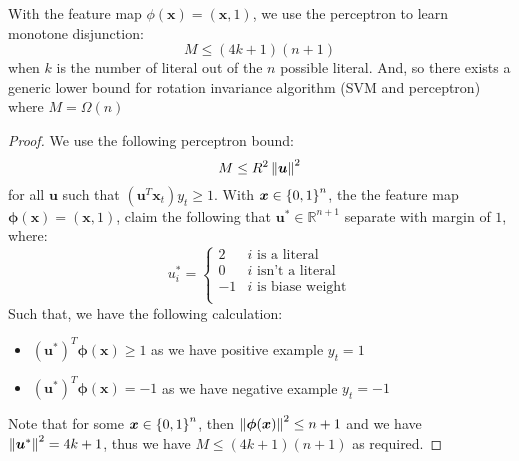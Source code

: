 \begin{corollary}
    With the feature map $\phi(\boldsymbol x) = (\boldsymbol x, 1)$, we use the perceptron to learn monotone disjunction:
    \begin{equation*}
        M \le (4k+1)(n+1)
    \end{equation*}
    when $k$ is the number of literal out of the $n$ possible literal. And, so there exists a generic lower bound for rotation invariance algorithm (SVM and perceptron) where $M = \Omega(n)$
\end{corollary}
\begin{proof}
    We use the following perceptron bound:
    \begin{equation*}
        M \le R^2\left\lVert\boldsymbol u\right\rVert^2
    \end{equation*}
    for all $\boldsymbol u$ such that $(\boldsymbol u^T\boldsymbol x_t)y_t \ge 1$. With $\boldsymbol x \in \left\{ 0, 1 \right\}^n$, the the feature map $\boldsymbol \phi(\boldsymbol x) = (\boldsymbol x, 1)$, claim the following that $\boldsymbol u^* \in \mathbb{R}^{n+1}$ separate with margin of $1$, where:
    \begin{equation*}
        u_i^* = \begin{cases}
            2 & i \text{ is a literal} \\
            0 & i \text{ isn't a literal} \\
            -1 & i \text{ is biase weight} \\
        \end{cases}
    \end{equation*}
    Such that, we have the following calculation:
    \begin{itemize}
        \item $(\boldsymbol u^*)^T\boldsymbol \phi(\boldsymbol x) \ge 1$ as we have positive example $y_t = 1$
        \item $(\boldsymbol u^*)^T\boldsymbol \phi(\boldsymbol x) = -1$ as we have negative example $y_t = -1$
    \end{itemize}
    Note that for some $\boldsymbol x \in \left\{ 0, 1 \right\}^n$, then $\left\lVert\boldsymbol \phi(\boldsymbol x)\right\rVert^2 \le n + 1$ and we have $\left\lVert\boldsymbol u^*\right\rVert^2 = 4k+1$, thus we have $M \le (4k+1)(n+1)$ as required.
\end{proof}

